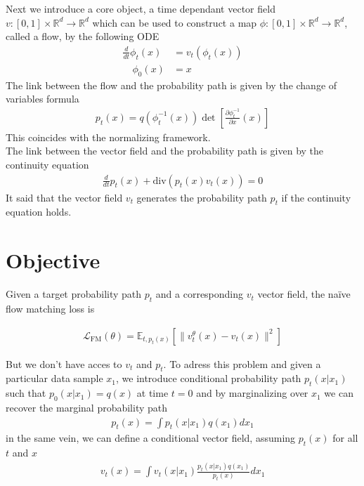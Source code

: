 \documentclass[a4paper,12pt]{article}
\begin{document}
\newpage

Next we introduce a core object, a time dependant vector field \(v:[0,1]\times \mathbb{R}^d\rightarrow\mathbb{R}^d\) which can be used to construct a map \(\phi:[0,1]\times\mathbb{R}^d\rightarrow\mathbb{R}^d\), called a flow, by the following ODE
\begin{align}
    \frac{d}{dt}\phi_t(x)&=v_t(\phi_t(x))\\
    \quad \phi_0(x)&=x \nonumber
\end{align}  
The link between the flow and the probability path is given by the change of variables formula 
\begin{align}
    p_t(x)=q(\phi_t^{-1}(x))\det \left[\frac{\partial\phi_t^{-1}}{\partial x}(x)\right]
\end{align}
This coincides with the normalizing framework. \\
The link between the vector field and the probability path is given by the continuity equation 
\begin{align}
  \frac{d}{dt}p_t(x)+\text{div}(p_t(x)v_t(x))=0
\end{align}
It said that the vector field \(v_t\) generates the probability path \(p_t\) if the continuity equation holds.\\
\bigskip

\section{Objective}
Given a target probability path \(p_t\) and a corresponding \(v_t\) vector field, the naïve flow matching loss is 

\begin{align}
    \mathcal{L}_\text{FM}(\theta) = \mathbb{E}_{t,p_t(x)}\left[\|v_t^\theta(x)-v_t(x)\|^2\right]
\end{align}

But we don't have acces to \(v_t\) and \(p_t\). To adress this problem and given a particular data sample \(x_1\), we introduce conditional probability path \(p_t(x|x_1)\) such that \(p_0(x|x_1)=q(x)\) at time \(t=0\) and by marginalizing over \(x_1\) we can recover the marginal probability path  
\begin{align}
  p_t(x)=\int p_t(x|x_1)q(x_1)dx_1
\end{align}
in the same vein, we can define a conditional vector field, assuming \(p_t(x)\) for all \(t\) and \(x\) 
\begin{align}
  v_t(x)=\int v_t(x|x_1)\frac{p_t(x|x_1)q(x_1)}{p_t(x)}dx_1
\end{align}
\end{document}
